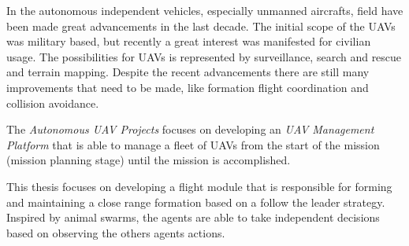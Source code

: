 
In the autonomous independent vehicles, especially unmanned aircrafts, field
have been made great advancements in the last decade. The initial scope of
the UAVs was military based, but recently a great interest was manifested
for civilian usage. The possibilities for UAVs is represented by surveillance, 
search and rescue and terrain mapping. Despite the recent advancements there
are still many improvements that need to be made, like formation flight coordination
and collision avoidance.

The \textit{Autonomous UAV Projects} focuses on developing an \textit{UAV 
Management Platform} that is able to manage a fleet of UAVs from the start of 
the mission (mission planning stage) until the mission is accomplished.

This thesis focuses on developing a flight module that is responsible
for forming and maintaining a close range formation based on a follow the leader
strategy. Inspired by animal swarms, the agents are able to take independent
decisions based on observing the others agents actions.